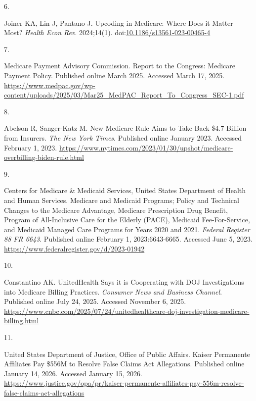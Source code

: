 \documentclass[
  12pt,
  number]{elsarticle}
\newlength{\cslhangindent}
\newlength{\csllabelwidth}
\newenvironment{CSLReferences}[2] %
 {\begin{list}{}{%
  \setlength{\itemindent}{0pt}
  \setlength{\leftmargin}{0pt}
  \setlength{\parsep}{0pt}
  \ifodd #1
   \setlength{\leftmargin}{\cslhangindent}
   \setlength{\itemindent}{-1\cslhangindent}
  \fi
  \setlength{\itemsep}{#2\baselineskip}}}
 {\end{list}}
\newcommand{\CSLLeftMargin}[1]{\parbox[t]{\csllabelwidth}{\strut#1\strut}}
\newcommand{\CSLRightInline}[1]{\parbox[t]{\linewidth - \csllabelwidth}{\strut#1\strut}}
\begin{document}
\begin{CSLReferences}{0}{1}
\CSLLeftMargin{6. }%
\CSLRightInline{Joiner KA, Lin J, Pantano J. {Upcoding in Medicare:
Where Does it Matter Most?} \emph{{Health Econ Rev}}. 2024;14(1).
doi:\href{https://doi.org/10.1186/s13561-023-00465-4}{10.1186/s13561-023-00465-4}}

\CSLLeftMargin{7. }%
\CSLRightInline{Medicare Payment Advisory Commission. {Report to the
Congress: Medicare Payment Policy}. Published online March 2025.
Accessed March 17, 2025.
\url{https://www.medpac.gov/wp-content/uploads/2025/03/Mar25_MedPAC_Report_To_Congress_SEC-1.pdf}}

\CSLLeftMargin{8. }%
\CSLRightInline{Abelson R, Sanger-Katz M. {New Medicare Rule Aims to
Take Back \$4.7 Billion from Insurers}. \emph{The New York Times}.
Published online January 2023. Accessed February 1, 2023.
\url{https://www.nytimes.com/2023/01/30/upshot/medicare-overbilling-biden-rule.html}}

\CSLLeftMargin{9. }%
\CSLRightInline{Centers for Medicare \& Medicaid Services, United States
Department of Health and Human Services. {Medicare and Medicaid
Programs; Policy and Technical Changes to the Medicare Advantage,
Medicare Prescription Drug Benefit, Program of All-Inclusive Care for
the Elderly (PACE), Medicaid Fee-For-Service, and Medicaid Managed Care
Programs for Years 2020 and 2021}. \emph{Federal Register 88 FR 6643}.
Published online February 1, 2023:6643-6665. Accessed June 5, 2023.
\url{https://www.federalregister.gov/d/2023-01942}}

\CSLLeftMargin{10. }%
\CSLRightInline{Constantino AK. {UnitedHealth Says it is Cooperating
with DOJ Investigations into Medicare Billing Practices}. \emph{Consumer
News and Business Channel}. Published online July 24, 2025. Accessed
November 6, 2025.
\url{https://www.cnbc.com/2025/07/24/unitedhealthcare-doj-investigation-medicare-billing.html}}

\CSLLeftMargin{11. }%
\CSLRightInline{United States Department of Justice, Office of Public
Affairs. {Kaiser Permanente Affiliates Pay \$556M to Resolve False
Claims Act Allegations}. Published online January 14, 2026. Accessed
January 15, 2026.
\url{https://www.justice.gov/opa/pr/kaiser-permanente-affiliates-pay-556m-resolve-false-claims-act-allegations}}


\end{CSLReferences}
\end{document}

